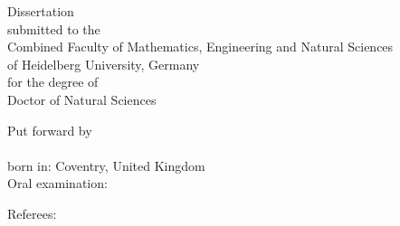 %




\begin{titlepage}
	\centering
	\begin{large}
		Dissertation\\%
		submitted to the\\
		Combined Faculty of Mathematics, Engineering and Natural Sciences\\
		of Heidelberg University, Germany\\
		for the degree of\\%
		Doctor of Natural Sciences\\

		\hfill
		\vfill

		Put forward by\\%
		\thesisName\\
		born in: Coventry, United Kingdom\\%
		Oral examination: \thesisExamDate\\
	\end{large}
\end{titlepage}

\begin{titlepage}
	\centering
	{\LARGE \thesisTitle}
	\hfill
	\vfill

	\begin{minipage}[t]{.3\textwidth}
		\raggedleft
		{\large Referees:}
	\end{minipage}
	\hspace*{.1\textwidth}
	\begin{minipage}[t]{.585\textwidth}
		{\large \thesisFirstReviewer} \\
		{\large \thesisSecondReviewer} \\
	\end{minipage} \\[5mm]

	\newpage
\end{titlepage}


